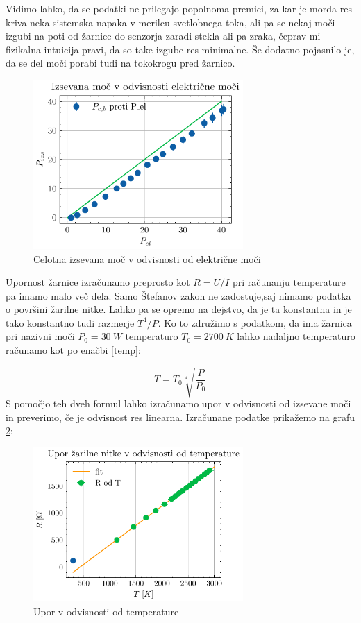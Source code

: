 \documentclass[10pt]{article}
\begin{document}
Vidimo lahko, da se podatki ne prilegajo popolnoma premici, za kar je morda res kriva neka sistemska napaka v merilcu svetlobnega toka, ali pa se nekaj moči izgubi na poti od žarnice do senzorja zaradi stekla ali pa zraka, čeprav mi fizikalna intuicija pravi, da so take izgube res minimalne. Še dodatno pojasnilo je, da se del moči porabi tudi na tokokrogu pred žarnico.

\begin{figure}[ht]
\begin{center}
    \includegraphics[width=8cm]{izkoristek.pdf}
    \caption{Celotna izsevana moč v odvisnosti od električne moči}
    \label{izkoristek}
\end{center}
\end{figure}

\newpage

Upornost žarnice izračunamo preprosto kot $R = U/I$ pri računanju temperature pa imamo malo več dela. Samo Štefanov zakon ne zadostuje,saj nimamo podatka o površini žarilne nitke. Lahko pa se opremo na dejstvo, da je ta konstantna in je tako konstantno tudi razmerje $T^4/P$. Ko to združimo s podatkom, da ima žarnica pri nazivni moči $P_0 = 30\ W$ temperaturo $T_0=2700\ K$ lahko nadaljno temperaturo računamo kot po enačbi \ref{temp}:

\begin{equation}
    T = T_0 \sqrt[4]{\frac{P}{P_0}}
    \label{temp}
\end{equation}
S pomočjo teh dveh formul lahko izračunamo upor v odvisnosti od izsevane moči in preverimo, če je odvisnost res linearna. Izračunane podatke prikažemo na grafu \ref{upor}:

\begin{figure}[ht]
\begin{center}
    \includegraphics[width=8cm]{upor.pdf}
    \caption{Upor v odvisnosti od temperature}
    \label{upor}
\end{center}
\end{figure}
\end{document}
